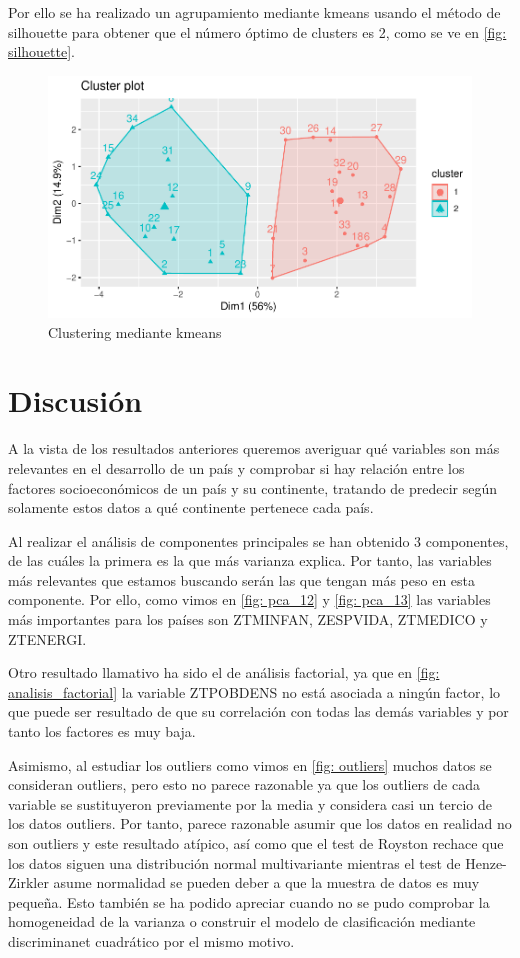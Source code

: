 \documentclass[twoside,openright,titlepage,numbers=noenddot,openany,headinclude,footinclude=true,
cleardoublepage=empty,abstractoff,BCOR=5mm,paper=a4,fontsize=12pt,main=spanish]{scrreprt}
\begin{document}
Por ello se ha realizado un agrupamiento mediante kmeans usando el método de silhouette para obtener que el número óptimo de clusters es 2, como se ve en \eqref{fig: silhouette}.

\begin{figure}[H]
\includegraphics[scale=1]{kmeans.pdf}
\caption{Clustering mediante kmeans}
\label{fig: kmeans}
\end{figure}

\section{Discusión}

A la vista de los resultados anteriores queremos averiguar qué variables son más relevantes en el desarrollo de un país y comprobar si hay relación entre los factores socioeconómicos de un país y su continente, tratando de predecir según solamente estos datos a qué continente pertenece cada país.

Al realizar el análisis de componentes principales se han obtenido $3$ componentes, de las cuáles la primera es la que más varianza explica. Por tanto, las variables más relevantes que estamos buscando serán las que tengan más peso en esta componente. Por ello, como vimos en \eqref{fig: pca_12} y \eqref{fig: pca_13} las variables más importantes para los países son ZTMINFAN, ZESPVIDA, ZTMEDICO y ZTENERGI.

Otro resultado llamativo ha sido el de análisis factorial, ya que en \eqref{fig: analisis_factorial} la variable ZTPOBDENS no está asociada a ningún factor, lo que puede ser resultado de que su correlación con todas las demás variables y por tanto los factores es muy baja.

Asimismo, al estudiar los outliers como vimos en \eqref{fig: outliers} muchos datos se consideran outliers, pero esto no parece razonable ya que los outliers de cada variable se sustituyeron previamente por la media y considera casi un tercio de los datos outliers. Por tanto, parece razonable asumir que los datos en realidad no son outliers y este resultado atípico, así como que el test de Royston rechace que los datos siguen una distribución normal multivariante mientras el test de Henze-Zirkler asume normalidad se pueden deber a que la muestra de datos es muy pequeña. Esto también se ha podido apreciar cuando no se pudo comprobar la homogeneidad de la varianza o construir el modelo de clasificación mediante discriminanet cuadrático por el mismo motivo.
\end{document}
